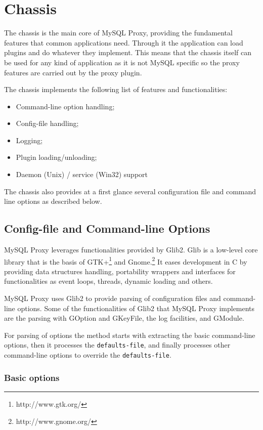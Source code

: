 \section{Chassis}

The chassis is the main core of MySQL Proxy, providing the fundamental features that common applications need. Through it the application can load plugins and do whatever they implement. This means that the chassis itself can be used for any kind of application as it is not MySQL specific so the proxy features are carried out by the proxy plugin.


The chassis implements the following list of features and functionalities:

\begin{itemize}
	\item Command-line option handling;
	\item Config-file handling;
	\item Logging;
	\item Plugin loading/unloading;
	\item Daemon (Unix) / service (Win32) support 
\end{itemize}


The chassis also provides at a first glance several configuration file and command line options as described below.

\subsection{Config-file and Command-line Options}

MySQL Proxy leverages functionalities provided by Glib2. Glib is a low-level core library that is the basis of GTK+\footnote{http://www.gtk.org/} and Gnome.\footnote{http://www.gnome.org/} It eases development in C by providing data structures handling, portability wrappers and interfaces for functionalities as event loops, threads, dynamic loading and others.

MySQL Proxy uses Glib2 to provide parsing of configuration files and command-line options. Some of the functionalities of Glib2 that MySQL Proxy implements are the parsing with GOption and GKeyFile, the log facilities, and GModule.

For parsing of options the method starts with extracting the basic command-line options, then it processes the \texttt{defaults-file}, and finally processes other command-line options to override the \texttt{defaults-file}.

\subsubsection{Basic options}

